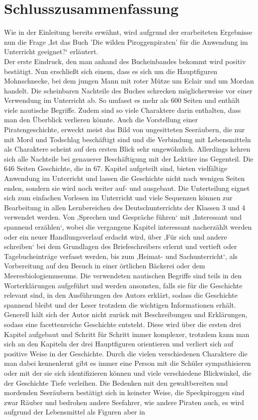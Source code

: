 \chapter{Schlusszusammenfassung}

Wie in der Einleitung bereits erwähnt, wird aufgrund der erarbeiteten Ergebnisse nun die Frage ‚Ist das Buch 'Die wilden Piroggenpiraten' für die Anwendung im Unterricht geeignet?‘ erläutert.
\\
Der erste Eindruck, den man anhand des Bucheinbandes bekommt wird positiv bestätigt. Nun erschließt sich einem, dass es sich um die Hauptfiguren Mohnschnecke, bei dem jungen Mann mit roter Mütze um Eclair und um Mordan handelt. 
Die scheinbaren Nachteile des Buches schrecken möglicherweise vor einer Verwendung im Unterricht ab. So umfasst es mehr als 600 Seiten und enthält viele nautische Begriffe. Zudem sind so viele Charaktere darin enthalten, dass man den Überblick verlieren könnte. Auch die Vorstellung einer Piratengeschichte, erweckt meist das Bild von ungesitteten Seeräubern, die nur mit Mord und Todschlag beschäftigt sind und die Verbindung mit Lebensmitteln als Charaktere scheint auf den ersten Blick sehr ungewöhnlich. Allerdings kehren sich alle Nachteile bei genauerer Beschäftigung mit der Lektüre ins Gegenteil. Die 646 Seiten Geschichte, die in 67. Kapitel aufgeteilt sind, bieten vielfältige Anwendung im Unterricht und lassen die Geschichte nicht nach wenigen Seiten enden, sondern sie wird noch weiter auf- und ausgebaut. Die Unterteilung eignet sich zum einfachen Vorlesen im Unterricht und viele Sequenzen können zur Bearbeitung in allen Lernbereichen des Deutschunterrichts der Klassen 3 \cite[S.172ff]{LP} und 4 \cite[S.246ff]{LP}  verwendet werden. Von ‚Sprechen und Gespräche führen‘ mit ‚Interessant und spannend erzählen‘, wobei die vergangene Kapitel interessant nacherzählt werden oder ein neuer Handlungsverlauf erdacht wird, über ‚Für sich und andere schreiben‘ bei dem Grundlagen des Briefeschreibers erlernt und vertieft oder Tagebucheinträge verfasst werden, bis zum ‚Heimat- und Sachunterricht‘, als Vorbereitung auf den Besuch in einer örtlichen Bäckerei oder dem Meeresbiologiemuseums. Die verwendeten nautischen Begriffe sind teils in den Worterklärungen \cite[S.647]{pir} aufgeführt und werden ansonsten, falls sie für die Geschichte relevant sind, in den Ausführungen des Autors erklärt, sodass die Geschichte spannend bleibt und der Leser trotzdem die wichtigen Informationen erhält. Generell hält sich der Autor nicht zurück mit Beschreibungen und Erklärungen, sodass eine facettenreiche Geschichte entsteht. Diese wird über die ersten drei Kapitel aufgebaut und Schritt für Schritt immer komplexer, trotzdem kann man sich an den Kapiteln der drei Hauptfiguren orientieren und verliert sich auf positive Weise in der Geschichte. Durch die vielen verschiedenen Charaktere die man dabei kennenlernt gibt es immer eine Person mit die Schüler sympathisieren oder mit der sie sich identifizieren können und viele verschiedene Blickwinkel, die der Geschichte Tiefe verleihen. Die Bedenken mit den gewaltbereiten und mordenden Seeräubern bestätigt sich in keinster Weise, die Speckpiroggen sind zwar Räuber und bedrohen andere Seefahrer, wie andere Piraten auch, es wird aufgrund der Lebensmittel als Figuren aber in 